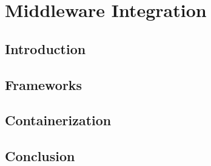 \chapter{Middleware Integration}

\section{Introduction}

\section{Frameworks}

\section{Containerization}

\section{Conclusion}
